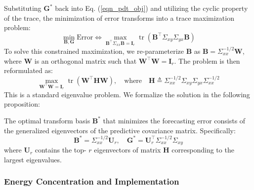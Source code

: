\documentclass[final,3p,times]{elsarticle}
\begin{document}
Substituting $\mathbf{G}^*$ back into Eq. (\ref{eqn_pdt_obj}) and utilizing the cyclic property of the trace, the minimization of error transforms into a trace maximization problem:
\begin{equation}
\label{eqn_pdt_max}
\min_{\mathbf{B}, \mathbf{G}} \text{Error} \iff \max_{\mathbf{B}^\top \Sigma_{xx} \mathbf{B} = \mathbf{I}_r} \operatorname{tr}\left (\mathbf{B}^\top \Sigma_{xy} \Sigma_{yx} \mathbf{B}\right)
\end{equation}
To solve this constrained maximization, we re-parameterize $\mathbf{B}$ as $\mathbf{B} = \Sigma_{xx}^{-1/2} \mathbf{W}$, where $\mathbf{W}$ is an orthogonal matrix such that $\mathbf{W}^\top \mathbf{W} = \mathbf{I}_r$. The problem is then reformulated as:
\begin{equation}
\label{eqn_pdt_tr}
\max_{\mathbf{W}^\top \mathbf{W} = \mathbf{I}_r} \operatorname{tr}(\mathbf{W}^\top \mathbf{H} \mathbf{W}), \quad \text{where} \quad \mathbf{H} \triangleq \Sigma_{xx}^{-1/2} \Sigma_{xy} \Sigma_{yx} \Sigma_{xx}^{-1/2}
\end{equation}
This is a standard eigenvalue problem. We formalize the solution in the following proposition:
\begin{proposition}
The optimal transform basis $\mathbf{B}^*$ that minimizes the forecasting error consists of the generalized eigenvectors of the predictive covariance matrix. Specifically:
\begin{equation}
\mathbf{B}^* = \Sigma_{xx}^{-1/2} \mathbf{U}_r, \quad \mathbf{G}^* = \mathbf{U}_r^\top \Sigma_{xx}^{-1/2} \Sigma_{xy}
\end{equation}
where $\mathbf{U}_r$ contains the top- $r$ eigenvectors of matrix $\mathbf{H}$ corresponding to the largest eigenvalues.
\end{proposition}

\subsubsection{Energy Concentration and Implementation}
\end{document}
